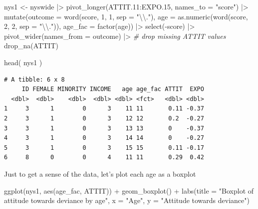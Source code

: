 \documentclass[
  letterpaper,
  DIV=11,
  numbers=noendperiod]{scrreprt}
\newenvironment{Shaded}{}{}
\newcommand{\AttributeTok}[1]{\textcolor[rgb]{0.49,0.56,0.16}{#1}}
\newcommand{\CommentTok}[1]{\textcolor[rgb]{0.38,0.63,0.69}{\textit{#1}}}
\newcommand{\DecValTok}[1]{\textcolor[rgb]{0.25,0.63,0.44}{#1}}
\newcommand{\FloatTok}[1]{\textcolor[rgb]{0.25,0.63,0.44}{#1}}
\newcommand{\FunctionTok}[1]{\textcolor[rgb]{0.02,0.16,0.49}{#1}}
\newcommand{\NormalTok}[1]{#1}
\newcommand{\OtherTok}[1]{\textcolor[rgb]{0.00,0.44,0.13}{#1}}
\newcommand{\SpecialCharTok}[1]{\textcolor[rgb]{0.25,0.44,0.63}{#1}}
\newcommand{\StringTok}[1]{\textcolor[rgb]{0.25,0.44,0.63}{#1}}
\begin{document}
\begin{Shaded}
\begin{Highlighting}[]
\NormalTok{nys1 }\OtherTok{\textless{}{-}}\NormalTok{ nyswide }\SpecialCharTok{|\textgreater{}} 
  \FunctionTok{pivot\_longer}\NormalTok{(ATTIT}\FloatTok{.11}\SpecialCharTok{:}\NormalTok{EXPO}\FloatTok{.15}\NormalTok{, }\AttributeTok{names\_to =} \StringTok{"score"}\NormalTok{) }\SpecialCharTok{|\textgreater{}} 
  \FunctionTok{mutate}\NormalTok{(}\AttributeTok{outcome =} \FunctionTok{word}\NormalTok{(score, }\DecValTok{1}\NormalTok{, }\DecValTok{1}\NormalTok{, }\AttributeTok{sep =} \StringTok{"}\SpecialCharTok{\textbackslash{}\textbackslash{}}\StringTok{."}\NormalTok{),}
         \AttributeTok{age =} \FunctionTok{as.numeric}\NormalTok{(}\FunctionTok{word}\NormalTok{(score, }\DecValTok{2}\NormalTok{, }\DecValTok{2}\NormalTok{, }\AttributeTok{sep =} \StringTok{"}\SpecialCharTok{\textbackslash{}\textbackslash{}}\StringTok{."}\NormalTok{)),}
         \AttributeTok{age\_fac =} \FunctionTok{factor}\NormalTok{(age)) }\SpecialCharTok{|\textgreater{}} 
  \FunctionTok{select}\NormalTok{(}\SpecialCharTok{{-}}\NormalTok{score) }\SpecialCharTok{|\textgreater{}} 
  \FunctionTok{pivot\_wider}\NormalTok{(}\AttributeTok{names\_from =}\NormalTok{ outcome) }\SpecialCharTok{|\textgreater{}} 
  \CommentTok{\# drop missing ATTIT values}
  \FunctionTok{drop\_na}\NormalTok{(ATTIT)}

\FunctionTok{head}\NormalTok{( nys1 )}
\end{Highlighting}
\end{Shaded}

\begin{verbatim}
# A tibble: 6 x 8
     ID FEMALE MINORITY INCOME   age age_fac ATTIT  EXPO
  <dbl>  <dbl>    <dbl>  <dbl> <dbl> <fct>   <dbl> <dbl>
1     3      1        0      3    11 11       0.11 -0.37
2     3      1        0      3    12 12       0.2  -0.27
3     3      1        0      3    13 13       0    -0.37
4     3      1        0      3    14 14       0    -0.27
5     3      1        0      3    15 15       0.11 -0.17
6     8      0        0      4    11 11       0.29  0.42
\end{verbatim}

Just to get a sense of the data, let's plot each age as a boxplot

\begin{Shaded}
\begin{Highlighting}[]
  \FunctionTok{ggplot}\NormalTok{(nys1, }\FunctionTok{aes}\NormalTok{(age\_fac, ATTIT)) }\SpecialCharTok{+}
    \FunctionTok{geom\_boxplot}\NormalTok{() }\SpecialCharTok{+} 
    \FunctionTok{labs}\NormalTok{(}\AttributeTok{title =} \StringTok{"Boxplot of attitude towards deviance by age"}\NormalTok{, }
         \AttributeTok{x =} \StringTok{"Age"}\NormalTok{, }\AttributeTok{y =} \StringTok{"Attitude towards deviance"}\NormalTok{)}
\end{Highlighting}
\end{Shaded}
\end{document}
